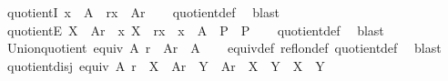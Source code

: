 \begin{isabellebody}
\isanewline
\isanewline
{}\isamarkupfalse%
\ quotientI{\isacharcolon}{\kern0pt}\ {\isachardoublequoteopen}x\ {\isasymin}\ A\ {\isasymLongrightarrow}\ r{\isacharbackquote}{\kern0pt}{\isacharbackquote}{\kern0pt}{\isacharbraceleft}{\kern0pt}x{\isacharbraceright}{\kern0pt}\ {\isasymin}\ A{\isacharslash}{\kern0pt}{\isacharslash}{\kern0pt}r{\isachardoublequoteclose}\isanewline
%
\isadelimproof
\ \ %
\endisadelimproof
%
\isatagproof
{}\isamarkupfalse%
\ quotient{\isacharunderscore}{\kern0pt}def\ \isamarkupfalse%
\ blast%
\endisatagproof
{\isafoldproof}%
%
\isadelimproof
\isanewline
%
\endisadelimproof
\isanewline
{}\isamarkupfalse%
\ quotientE{\isacharcolon}{\kern0pt}\ {\isachardoublequoteopen}X\ {\isasymin}\ A{\isacharslash}{\kern0pt}{\isacharslash}{\kern0pt}r\ {\isasymLongrightarrow}\ {\isacharparenleft}{\kern0pt}{\isasymAnd}x{\isachardot}{\kern0pt}\ X\ {\isacharequal}{\kern0pt}\ r{\isacharbackquote}{\kern0pt}{\isacharbackquote}{\kern0pt}{\isacharbraceleft}{\kern0pt}x{\isacharbraceright}{\kern0pt}\ {\isasymLongrightarrow}\ x\ {\isasymin}\ A\ {\isasymLongrightarrow}\ P{\isacharparenright}{\kern0pt}\ {\isasymLongrightarrow}\ P{\isachardoublequoteclose}\isanewline
%
\isadelimproof
\ \ %
\endisadelimproof
%
\isatagproof
{}\isamarkupfalse%
\ quotient{\isacharunderscore}{\kern0pt}def\ \isamarkupfalse%
\ blast%
\endisatagproof
{\isafoldproof}%
%
\isadelimproof
\isanewline
%
\endisadelimproof
\isanewline
{}\isamarkupfalse%
\ Union{\isacharunderscore}{\kern0pt}quotient{\isacharcolon}{\kern0pt}\ {\isachardoublequoteopen}equiv\ A\ r\ {\isasymLongrightarrow}\ {\isasymUnion}{\isacharparenleft}{\kern0pt}A{\isacharslash}{\kern0pt}{\isacharslash}{\kern0pt}r{\isacharparenright}{\kern0pt}\ {\isacharequal}{\kern0pt}\ A{\isachardoublequoteclose}\isanewline
%
\isadelimproof
\ \ %
\endisadelimproof
%
\isatagproof
{}\isamarkupfalse%
\ equiv{\isacharunderscore}{\kern0pt}def\ refl{\isacharunderscore}{\kern0pt}on{\isacharunderscore}{\kern0pt}def\ quotient{\isacharunderscore}{\kern0pt}def\ \isamarkupfalse%
\ blast%
\endisatagproof
{\isafoldproof}%
%
\isadelimproof
\isanewline
%
\endisadelimproof
\isanewline
{}\isamarkupfalse%
\ quotient{\isacharunderscore}{\kern0pt}disj{\isacharcolon}{\kern0pt}\ {\isachardoublequoteopen}equiv\ A\ r\ {\isasymLongrightarrow}\ X\ {\isasymin}\ A{\isacharslash}{\kern0pt}{\isacharslash}{\kern0pt}r\ {\isasymLongrightarrow}\ Y\ {\isasymin}\ A{\isacharslash}{\kern0pt}{\isacharslash}{\kern0pt}r\ {\isasymLongrightarrow}\ X\ {\isacharequal}{\kern0pt}\ Y\ {\isasymor}\ X\ {\isasyminter}\ Y\ {\isacharequal}{\kern0pt}\ {\isacharbraceleft}{\kern0pt}{\isacharbraceright}{\kern0pt}{\isachardoublequoteclose}\isanewline

\end{isabellebody}
